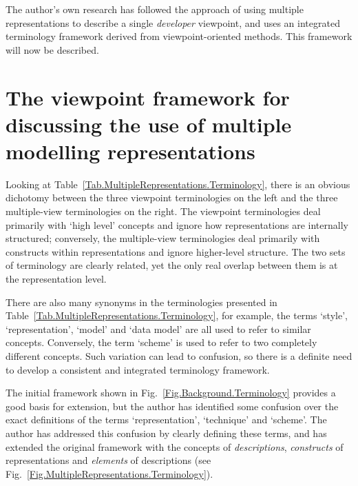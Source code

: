 \documentclass[11pt,oribibl]{llncs}
\begin{document}
The author's own research \cite{Stan:N:1999:PhD,Stan:N:1997:ECIS97} has followed the approach of using multiple representations to describe a single \emph{developer} viewpoint, and uses an integrated terminology framework derived from viewpoint-oriented methods. This framework will now be described.


\section{The viewpoint framework for discussing the use of multiple modelling representations}
\label{Sec:Framework}

Looking at Table~\ref{Tab.MultipleRepresentations.Terminology}, there is an obvious dichotomy between the three viewpoint terminologies on the left and the three multiple-view terminologies on the right. The viewpoint terminologies deal primarily with `high level' concepts and ignore how representations are internally structured; conversely, the multiple-view terminologies deal primarily with constructs within representations and ignore higher-level structure. The two sets of terminology are clearly related, yet the only real overlap between them is at the representation level.

There are also many synonyms in the terminologies presented in Table~\ref{Tab.MultipleRepresentations.Terminology}, for example, the terms `style', `representation', `model' and `data model' are all used to refer to similar concepts. Conversely, the term `scheme' is used to refer to two completely different concepts. Such variation can lead to confusion, so there is a definite need to develop a consistent and integrated terminology framework.

The initial framework shown in Fig.~\ref{Fig.Background.Terminology} provides a good basis for extension, but the author has identified some confusion over the exact definitions of the terms `representation', `technique' and `scheme'. The author has addressed this confusion by clearly defining these terms, and has extended the original framework with the concepts of \emph{descriptions}, \emph{constructs} of representations and \emph{elements} of descriptions (see Fig.~\ref{Fig.MultipleRepresentations.Terminology}).

\end{document}
